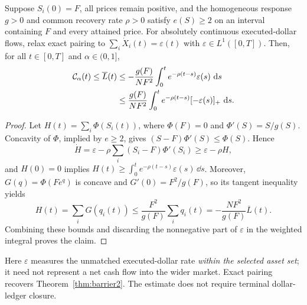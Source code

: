 \documentclass[review,hidelinks,onefignum,onetabnum]{siamonline250211}
\begin{document}
\begin{proposition}
\label{prop:unbalanced-stability}
Suppose $S_i(0)=F$, all prices remain positive, and the homogeneous
response $g>0$ and common recovery rate $\rho>0$ satisfy
$e(S)\ge2$ on an interval containing $F$ and every attained price.
For absolutely continuous executed-dollar flows, relax exact pairing
to $\sum_i\dot X_i(t)=\varepsilon(t)$ with
$\varepsilon\in L^1([0,T])$. Then, for all $t\in[0,T]$ and
$\alpha\in(0,1]$,
\[
\begin{aligned}
\mathcal{C}_\alpha(t)\le\overline L(t)
&\le-\frac{g(F)}{NF^2}
 \int_0^t e^{-\rho(t-s)}\varepsilon(s)\,\,\mathrm{d} s\\
&\le\frac{g(F)}{NF^2}
 \int_0^t e^{-\rho(t-s)}[-\varepsilon(s)]_+\,\,\mathrm{d} s.
\end{aligned}
\]
\end{proposition}
\begin{proof}
Let $H(t)=\sum_i\Phi(S_i(t))$, where $\Phi(F)=0$
and $\Phi'(S)=S/g(S)$. Concavity of $\Phi$, implied by
$e\ge2$, gives $(S-F)\Phi'(S)\le\Phi(S)$. Hence
\[
\dot H=\varepsilon-\rho\sum_i(S_i-F)\Phi'(S_i)
\ge\varepsilon-\rho H,
\]
and $H(0)=0$ implies
$H(t)\ge\int_0^t e^{-\rho(t-s)}\varepsilon(s)\,\dd s$.
Moreover, $G(q)=\Phi(Fe^q)$ is concave and
$G'(0)=F^2/g(F)$, so its tangent inequality yields
\[
H(t)=\sum_iG(q_i(t))
\le\frac{F^2}{g(F)}\sum_iq_i(t)
=-\frac{NF^2}{g(F)}\overline L(t).
\]
Combining these bounds and discarding the nonnegative part of
$\varepsilon$ in the weighted integral proves the claim.
\end{proof}

Here $\varepsilon$ measures the unmatched executed-dollar rate
\emph{within the selected asset set}; it need not represent a net
cash flow into the wider market. Exact pairing recovers
Theorem~\ref{thm:barrier2}. The estimate does not require
terminal dollar-ledger closure.
\end{document}
